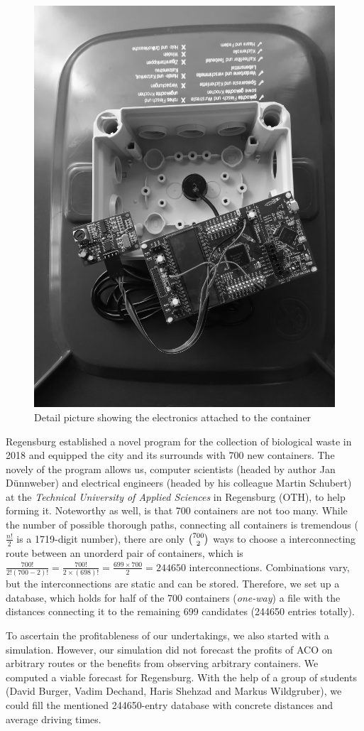 \documentclass[10pt]{article}
\begin{document}
\begin{figure}[h!]
    \centering
  \includegraphics[trim={3cm 4cm 3cm 3cm}, clip,width=0.5\linewidth]{sensor}
  \caption{Detail picture showing the electronics attached to the container}
  \label{fig:electronics}       %
\end{figure}

Regensburg established a novel program for the collection of biological waste in 2018 
and equipped the city and its surrounds with 700 new containers. The novely of the program
allows us, computer scientists (headed by author Jan D{\"u}nnweber) and electrical 
engineers (headed by his colleague Martin Schubert) at the {\it Technical 
University of Applied Sciences} in Regensburg (OTH), to help forming it.
Noteworthy as well, is that 700 containers are not too many. While the number
of possible thorough paths, connecting all containers is tremendous ($\frac{n!}{2}$ is a 
1719-digit number), there are only  $\tbinom {700}{2}$ ways to choose a interconnecting 
route between an unorderd pair of containers, which is 
$\frac{700!}{2!(700 - 2)!}=\frac{700!}{2 \times (698)!}=\frac{699 \times 700}{2}=244650$ interconnections. Combinations vary, but the interconnections are static and can be stored.
Therefore, we set up a database, which holds for half of the 700 containers ({\it one-way})
a file with the distances connecting it to the remaining 699 candidates (244650 entries
totally).

To ascertain the profitableness of our undertakings, we also started with a simulation.
However, our simulation did not forecast the profits of ACO on arbitrary routes or the
benefits from observing arbitrary containers. We computed a viable forecast for Regensburg.
With the help of a group of students (David Burger, Vadim Dechand, 
Haris Shehzad and Markus Wildgruber), we could fill the mentioned 
244650-entry database with concrete distances and average driving times. 
\end{document}
